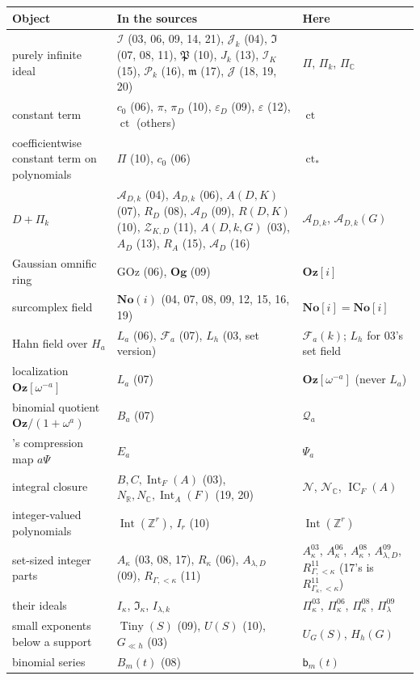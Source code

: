 \documentclass[11pt,letterpaper]{article}
\numberwithin{equation}{section}
\theoremstyle{definition}
\theoremstyle{remark}
\theoremstyle{plain}
\newcommand{\No}{\mathbf{No}}
\newcommand{\Oz}{\mathbf{Oz}}
\newcommand{\SC}{\No[i]}
\newcommand{\GOz}{\Oz[i]}
\newcommand{\Z}{\mathbb Z}
\newcommand{\R}{\mathbb R}
\newcommand{\C}{\mathbb C}
\newcommand{\A}{\mathcal A}          %
\newcommand{\FF}{\mathscr F}         %
\newcommand{\Qa}{\mathcal Q}         %
\newcommand{\NN}{\mathcal N}         %
\newcommand{\ct}{\operatorname{ct}}
\newcommand{\IC}{\operatorname{IC}}
\newcommand{\Int}{\operatorname{Int}}
\begin{document}
\begin{center}\small
\begin{tabular}{@{}>{\raggedright\arraybackslash}p{}>{\raggedright\arraybackslash}p{}>{\raggedright\arraybackslash}p{}@{}}
\toprule
Object & In the sources & Here\\
\midrule
purely infinite ideal & $\mathcal I$ (03, 06, 09, 14, 21), $\mathcal J_k$ (04), $\mathfrak I$ (07, 08, 11), $\mathfrak P$ (10), $J_k$ (13), $\mathcal I_K$ (15), $\mathcal P_k$ (16), $\mathfrak m$ (17), $\mathcal J$ (18, 19, 20) & $\Pi$, $\Pi_k$, $\Pi_\C$\\
constant term & $c_0$ (06), $\pi$, $\pi_D$ (10), $\varepsilon_D$ (09), $\varepsilon$ (12), $\ct$ (others) & $\ct$\\
coefficientwise constant term on polynomials & $\Pi$ (10), $c_0$ (06) & $\ct_*$\\
$D+\Pi_k$ & $\A_{D,k}$ (04), $A_{D,k}$ (06), $A(D,K)$ (07), $R_D$ (08), $\A_D$ (09), $R(D,K)$ (10), $\mathcal Z_{K,D}$ (11), $A(D,k,G)$ (03), $A_D$ (13), $R_A$ (15), $\mathcal A_D$ (16) & $\A_{D,k}$, $\A_{D,k}(G)$\\
Gaussian omnific ring & $\mathrm{GOz}$ (06), $\mathbf{Og}$ (09) & $\GOz$\\
surcomplex field & $\No(i)$ (04, 07, 08, 09, 12, 15, 16, 19) & $\SC=\No[i]$ \cite{RepoNotation}\\
Hahn field over $H_a$ & $L_a$ (06), $\mathscr F_a$ (07), $L_h$ (03, set version) & $\FF_a(k)$; $L_h$ for 03's set field\\
localization $\Oz[\omega^{-a}]$ & $L_a$ (07) & $\Oz[\omega^{-a}]$ (never $L_a$)\\
binomial quotient $\Oz/(1+\omega^a)$ & $B_a$ (07) & $\Qa_a$\\
07's compression map $a\Psi$ & $E_a$ & $\Psi_a$\\
integral closure & $B,C,\Int_F(A)$ (03), $N_\R,N_\C,\Int_A(F)$ (19, 20) & $\NN$, $\NN_\C$, $\IC_F(A)$\\
integer-valued polynomials & $\Int(\Z^r)$, $I_r$ (10) & $\Int(\Z^r)$\\
set-sized integer parts & $A_\kappa$ (03, 08, 17), $R_\kappa$ (06), $A_{\lambda,D}$ (09), $R_{\Gamma,<\kappa}$ (11) & $A^{03}_\kappa$, $A^{06}_\kappa$, $A^{08}_\kappa$, $A^{09}_{\lambda,D}$, $R^{11}_{\Gamma,<\kappa}$ (17's is $R^{11}_{\Gamma_\kappa,<\kappa}$)\\
their ideals & $I_\kappa$, $\mathfrak I_\kappa$, $I_{\lambda,k}$ & $\Pi^{03}_\kappa$, $\Pi^{06}_\kappa$, $\Pi^{08}_\kappa$, $\Pi^{09}_\lambda$\\
small exponents below a support & $\operatorname{Tiny}(S)$ (09), $U(S)$ (10), $G_{\ll h}$ (03) & $U_G(S)$, $H_h(G)$\\
binomial series & $B_m(t)$ (08) & $\mathsf b_m(t)$\\
\bottomrule
\end{tabular}
\end{center}
\end{document}
